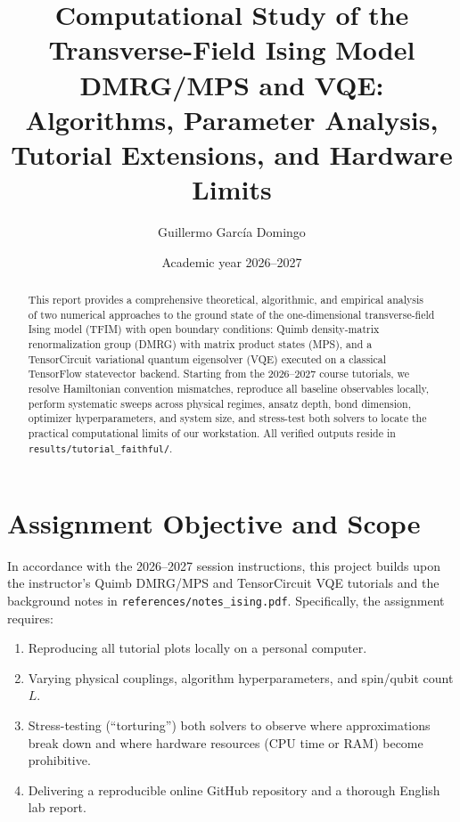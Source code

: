 \documentclass[11pt,a4paper]{article}
\title{\textbf{Computational Study of the Transverse-Field Ising Model}\\
\large DMRG/MPS and VQE: Algorithms, Parameter Analysis, Tutorial Extensions, and Hardware Limits}
\author{Guillermo García Domingo}
\date{Academic year 2026--2027}
\begin{document}
\maketitle

\begin{abstract}
This report provides a comprehensive theoretical, algorithmic, and empirical analysis of two numerical approaches to the ground state of the one-dimensional transverse-field Ising model (TFIM) with open boundary conditions: Quimb density-matrix renormalization group (DMRG) with matrix product states (MPS), and a TensorCircuit variational quantum eigensolver (VQE) executed on a classical TensorFlow statevector backend. Starting from the 2026--2027 course tutorials, we resolve Hamiltonian convention mismatches, reproduce all baseline observables locally, perform systematic sweeps across physical regimes, ansatz depth, bond dimension, optimizer hyperparameters, and system size, and stress-test both solvers to locate the practical computational limits of our workstation. All verified outputs reside in \texttt{results/tutorial\_faithful/}.
\end{abstract}

\tableofcontents
\newpage

\section{Assignment Objective and Scope}
In accordance with the 2026--2027 session instructions, this project builds upon the instructor's Quimb DMRG/MPS and TensorCircuit VQE tutorials and the background notes in \texttt{references/notes\_ising.pdf}. Specifically, the assignment requires:
\begin{enumerate}[leftmargin=*]
\item Reproducing all tutorial plots locally on a personal computer.
\item Varying physical couplings, algorithm hyperparameters, and spin/qubit count $L$.
\item Stress-testing (``torturing'') both solvers to observe where approximations break down and where hardware resources (CPU time or RAM) become prohibitive.
\item Delivering a reproducible online GitHub repository and a thorough English lab report.
\end{enumerate}
\end{document}
